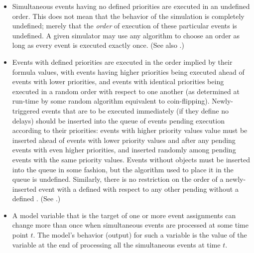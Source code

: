 \begin{itemize}
\item Simultaneous events having no defined priorities are
  executed in an undefined order.  This does not mean that the
  behavior of the simulation is completely undefined; merely that
  the \emph{order} of execution of these particular events is
  undefined.  A given simulator may use any algorithm to choose an
  order as long as every event is executed exactly once.  (See
  also .)

\item Events with defined priorities are executed in the order
  implied by their \Priority {} formula values, with
  events having higher priorities being executed ahead of events
  with lower priorities, and events with identical priorities
  being executed in a random order with respect to one another (as
  determined at run-time by some random algorithm equivalent to
  coin-flipping).  Newly-triggered events that are to be executed
  immediately (\ie if they define no delays) should be inserted
  into the queue of events pending execution according to their
  priorities: events with higher priority values value must be
  inserted ahead of events with lower priority values and after
  any pending events with even higher priorities, and inserted
  randomly among pending events with the same priority values.
  Events without \Priority objects must be inserted into the queue
  in some fashion, but the algorithm used to place it in the queue
  is undefined.  Similarly, there is no restriction on the order
  of a newly-inserted event with a defined \Priority with respect
  to any other pending \Event without a defined \Priority.  (See
  .)

\item A model variable that is the target of one or more event
  assignments can change more than once when simultaneous events
  are processed at some time point $t$.  The model's behavior
  (output) for such a variable is the value of the variable at the
  end of processing all the simultaneous events at time $t$.

\end{itemize}




